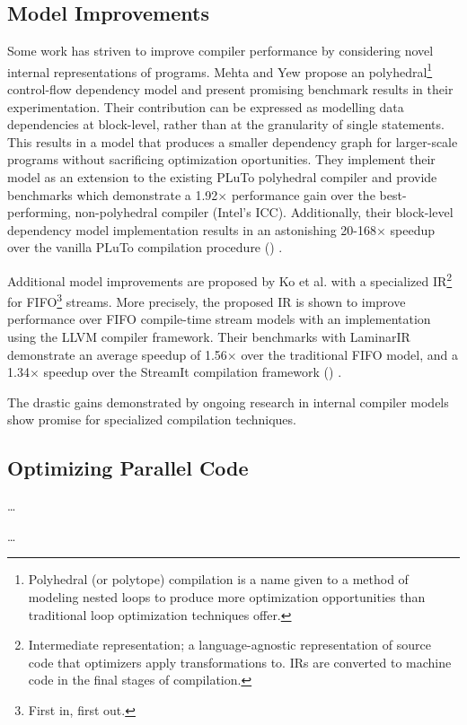 \documentclass[nobib]{tufte-handout}
\newcommand{\placeholdertext}[1]{
	\noindent{\color{red}{#1}}
}
\newcommand{\CiteThis}{
({\color{red}{CITE THIS}})
}
\begin{document}
\subsection{Model Improvements}
Some work has striven to improve compiler performance by considering novel internal representations of programs.  Mehta and Yew propose an polyhedral\footnote{Polyhedral (or polytope) compilation is a name given to a method of modeling nested loops to produce more optimization opportunities than traditional loop optimization techniques offer.} control-flow dependency model and present promising benchmark results in their experimentation.  Their contribution can be expressed as modelling data dependencies at block-level, rather than at the granularity of single statements.  This results in a model that produces a smaller dependency graph for larger-scale programs without sacrificing optimization oportunities.  They implement their model as an extension to the existing PLuTo polyhedral compiler and provide benchmarks which demonstrate a 1.92$\times$ performance gain over the best-performing, non-polyhedral compiler (Intel's ICC).  Additionally, their block-level dependency model implementation results in an astonishing 20-168$\times$ speedup over the vanilla PLuTo compilation procedure \CiteThis{}.

Additional model improvements are proposed by Ko et al. with a specialized IR\footnote{Intermediate representation; a language-agnostic representation of source code that optimizers apply transformations to.  IRs are converted to machine code in the final stages of compilation.} for FIFO\footnote{First in, first out.} streams.  More precisely, the proposed IR is shown to improve performance over FIFO compile-time stream models with an implementation using the LLVM compiler framework.  Their benchmarks with LaminarIR demonstrate an average speedup of 1.56$\times$ over the traditional FIFO model, and a 1.34$\times$ speedup over the StreamIt compilation framework \CiteThis{}.

The drastic gains demonstrated by ongoing research in internal compiler models show promise for specialized compilation techniques.



\subsection{Optimizing Parallel Code}
\placeholdertext{Automatic parallelization of code} \ldots \newline
\placeholdertext{Optimization of synchronization schemes} \ldots \newline
\end{document}
